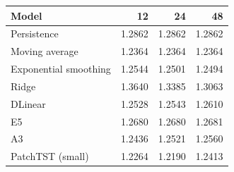 \begin{tabular}{lrrr}
\toprule
Model & 12 & 24 & 48 \\
\midrule
Persistence & 1.2862 & 1.2862 & 1.2862 \\
Moving average & 1.2364 & 1.2364 & 1.2364 \\
Exponential smoothing & 1.2544 & 1.2501 & 1.2494 \\
Ridge & 1.3640 & 1.3385 & 1.3063 \\
DLinear & 1.2528 & 1.2543 & 1.2610 \\
E5 & 1.2680 & 1.2680 & 1.2681 \\
A3 & 1.2436 & 1.2521 & 1.2560 \\
PatchTST (small) & 1.2264 & 1.2190 & 1.2413 \\
\bottomrule
\end{tabular}
